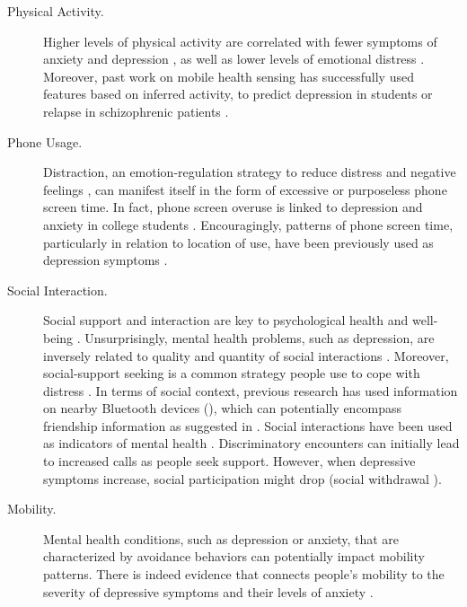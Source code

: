 \begin{description}
\item[Physical Activity.]     Higher levels of physical activity are correlated with fewer symptoms of anxiety and depression \citep{Stephens:1988}, as well as lower levels of emotional distress \citep{Steptoe:1996}. Moreover, past work on mobile health sensing has successfully used features based on inferred activity, \eg to predict depression in students \citep{Wang:2018} or relapse in schizophrenic patients \citep{Wang:2016}. 
\item[Phone Usage.] Distraction, an emotion-regulation strategy to reduce distress and negative feelings \citep{Sheppes:2011}, can manifest itself in the form of excessive or purposeless phone screen time. In fact, phone screen overuse is linked to depression and anxiety in college students \citep{Demirci:2015}. Encouragingly, patterns of phone screen time, particularly in relation to location of use, have been previously used as depression symptoms \citep{Wang:2018}. 
\item[Social Interaction.] Social support and interaction are key to psychological health and well-being \citep{Kawachi:2001}. Unsurprisingly, mental health problems, such as depression, are inversely related to quality and quantity of social interactions \citep{Nezlek:1994}. Moreover, social-support seeking is a common strategy people use to cope with distress \citep{Carver:1997}.  In terms of social context, previous research has used information on nearby Bluetooth devices (\eg \cite{wang2014studentlife}), which can potentially encompass friendship information as suggested in \citep{Eagle:2009}. Social interactions have been used as indicators of mental health \citep{Wang:2016}.  
Discriminatory encounters can initially lead to increased calls as people seek support. However, when depressive symptoms increase, social participation might drop (\eg social withdrawal \citep{Girard:2014}). 
\item[Mobility.] Mental health conditions, such as depression or anxiety, that are characterized by avoidance behaviors can potentially impact mobility patterns.  There is indeed evidence that connects people's mobility to the severity of depressive symptoms \citep{Saeb:2015, Saeb:2016} and their levels of anxiety \citep{Huang:2016}. 

\end{description}
